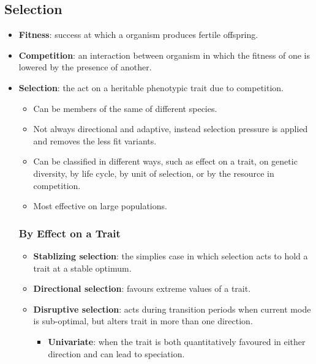 \documentclass[12pt,a4paper]{article}
\begin{document}
\subsection{Selection}
\begin{itemize}
    \item \textbf{Fitness}: success at which a organism produces fertile offspring.
    \item \textbf{Competition}: an interaction between organism in which the fitness of one is lowered by the presence of another.
    \item \textbf{Selection}: the act on a heritable phenotypic trait due to competition.
    \begin{itemize}
        \item Can be members of the same of different species.
        \item Not always directional and adaptive, instead selection pressure is applied and removes the less fit variants.
        \item Can be classified in different ways, such as effect on a trait, on genetic diversity, by life cycle, by unit of selection, or by the resource in competition.
        \item Most effective on large populations.
    \end{itemize}
    \subsubsection{By Effect on a Trait}
    \begin{itemize}
        \item \textbf{Stablizing selection}: the simplies case in which selection acts to hold a trait at a stable optimum.
        \item \textbf{Directional selection}: favours extreme values of a trait.
        \item \textbf{Disruptive selection}: acts during transition periods when current mode is sub-optimal, but alters trait in more than one direction.
            \begin{itemize}
                \item \textbf{Univariate}: when the trait is both quantitatively favoured in either direction and can lead to speciation.
            \end{itemize}
    \end{itemize}

\end{itemize}
\end{document}
